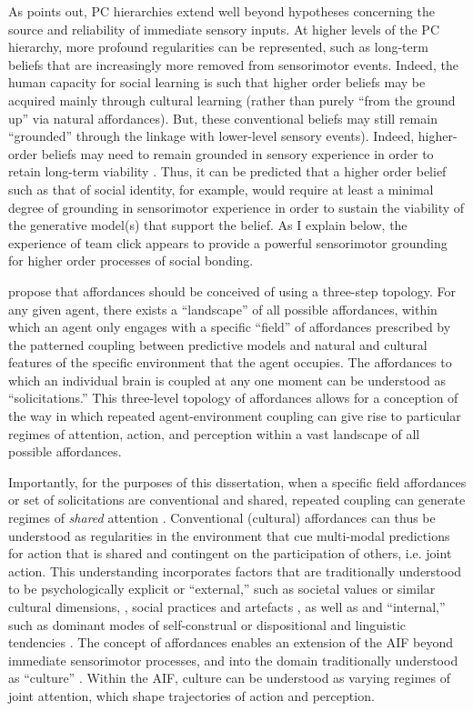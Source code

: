 \begin{CJK}{UTF8}{gbsn}
As \textcite[906]{Pezzulo2014} points out, PC hierarchies extend well beyond hypotheses concerning the source and reliability of immediate sensory inputs. At higher levels of the PC hierarchy, more profound regularities can be represented, such as long-term beliefs that are increasingly more removed from sensorimotor events. Indeed, the human capacity for social learning is such that higher order beliefs may be acquired mainly through cultural learning (rather than purely ``from the ground up'' via natural affordances). But, these conventional beliefs may still remain ``grounded'' through the linkage with lower-level sensory events).  Indeed, higher-order beliefs may need to remain grounded in sensory experience in order to retain long-term viability \citep{Ramstead2016}.  Thus, it can be predicted that a higher order belief such as that of social identity, for example, would require at least a minimal degree of grounding in sensorimotor experience in order to sustain the viability of the generative model(s) that support the belief.  As I explain below, the experience of team click appears to provide a powerful sensorimotor grounding for higher order processes of social bonding.

\textcite{Bruineberg2014} propose that affordances should be conceived of using a three-step topology. For any given agent, there exists a ``landscape'' of all possible affordances, within which an agent only engages with a specific ``field'' of affordances prescribed by the patterned coupling between predictive models and natural and cultural features of the specific environment that the agent occupies. The affordances to which an individual brain is coupled at any one moment can be understood as ``solicitations.''  This three-level topology of affordances allows for a conception of the way in which repeated agent-environment coupling can give rise to particular regimes of attention, action, and perception within a vast landscape of all possible affordances.

Importantly, for the purposes of this dissertation, when a specific field affordances or set of solicitations are conventional and shared, repeated coupling can generate regimes of \textit{shared} attention \citep{Ramstead2016}.  Conventional (cultural) affordances can thus be understood as regularities in the environment that cue multi-modal predictions for action that is shared and contingent on the participation of others, i.e. joint action.  This understanding incorporates factors that are traditionally understood to be psychologically explicit or ``external,'' such as societal values or similar cultural dimensions, \citep{Hofstede1991,Schwartz1992}, social practices and artefacts  \citep{Nisbett2003a}, as well as and ``internal,'' such as dominant modes of self-construal or dispositional and linguistic tendencies \citep{Markus1991}.  The concept of affordances enables an extension of the AIF beyond immediate sensorimotor processes, and into the domain traditionally understood as ``culture'' \citep{Roepstorff2010}.  Within the AIF, culture can be understood as varying regimes of joint attention, which shape trajectories of action and perception.


\end{CJK}
